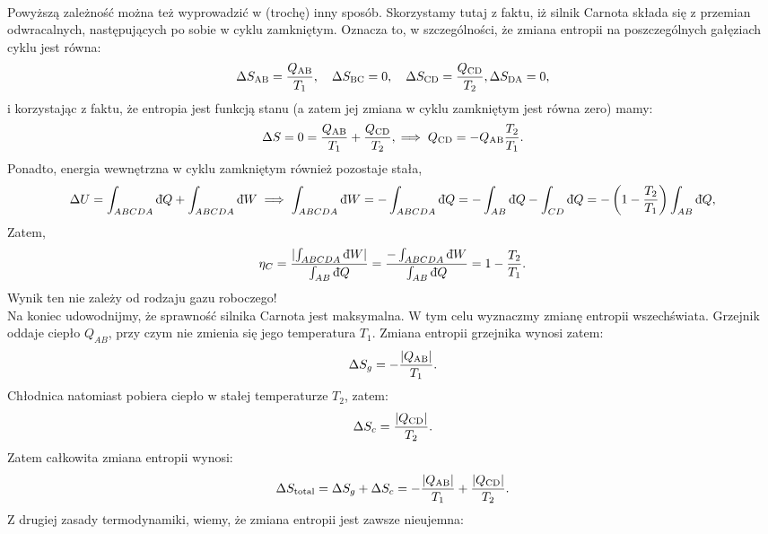 \documentclass[11pt,a4paper]{article}
\newcommand{\dbar}{{\mkern3mu\mathchar'26\mkern-12mu d}}
\begin{document}
\\
Powyższą zależność można też wyprowadzić w (trochę) inny sposób.  Skorzystamy tutaj z faktu, iż silnik Carnota składa się z przemian odwracalnych, następujących po sobie w cyklu zamkniętym. Oznacza to, w szczególności, że zmiana entropii na poszczególnych gałęziach cyklu jest równa:
\begin{align}
\Delta S_{\rm AB} = \frac{Q_{\rm AB}}{T_1} , \quad 
\Delta S_{\rm BC} =  0, \quad \Delta S_{\rm CD} = \frac{Q_{\rm CD}}{T_2}, \Delta S_{\rm DA} = 0,
\end{align}
i korzystając z faktu, że entropia jest funkcją stanu (a zatem jej zmiana w cyklu zamkniętym jest równa zero) mamy:
\begin{align}
\Delta S = 0 =  \frac{Q_{\rm AB}}{T_1}  +  \frac{Q_{\rm CD}}{T_2}, \implies  Q_{\rm CD} =- Q_{\rm AB} \frac{T_2}{T_1}.
\end{align}
Ponadto, energia wewnętrzna w cyklu zamkniętym również pozostaje stała,
\begin{align}
\Delta U = \int_{ABCDA}{\rm \dbar}Q + \int_{ABCDA}{\rm \dbar}W  \implies  \int_{ABCDA}{\rm \dbar}W  = -  \int_{ABCDA}{\rm \dbar}Q=-\int_{AB}{\rm \dbar}Q - \int_{CD}{\rm \dbar}Q = - \left(1-\frac{T_2}{T_1} \right)\int_{AB} {\rm \dbar}Q ,
\end{align}
Zatem,
\begin{align}
\eta_C= \frac{\lvert \int_{ABCDA}{\rm \dbar}W \rvert}{\int_{AB}{\rm \dbar }Q} = \frac{-\int_{ABCDA}{\rm \dbar}W }{\int_{AB}{\rm \dbar}Q} = 1- \frac{T_2}{T_1}.
\end{align}
Wynik ten nie zależy od rodzaju gazu roboczego!\\
Na koniec udowodnijmy, że sprawność silnika Carnota jest maksymalna. 
W tym celu wyznaczmy zmianę entropii wszechświata. Grzejnik oddaje ciepło $Q_{AB}$, przy czym nie zmienia się jego temperatura $T_1$. Zmiana entropii grzejnika wynosi zatem:
\begin{align}
\Delta S_g = - \frac{|Q_{\rm AB}|}{T_1}.
\end{align}
Chłodnica natomiast pobiera ciepło w stałej temperaturze $T_2$, zatem:
\begin{align}
\Delta S_c=  \frac{|Q_{\rm CD}|}{T_2}.
\end{align}
Zatem całkowita zmiana entropii wynosi:
\begin{align}
\Delta S_{\text{total}} = \Delta S_g + \Delta S_c = - \frac{|Q_{\rm AB}|}{T_1}+ \frac{|Q_{\rm CD}|}{T_2}.
\end{align}
Z drugiej zasady termodynamiki, wiemy, że zmiana entropii jest zawsze nieujemna:
\end{document}
